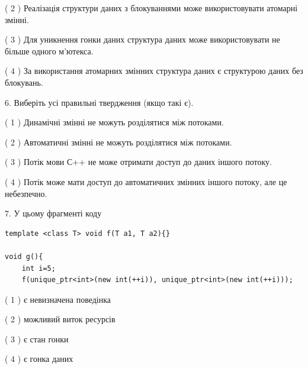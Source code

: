 \documentclass[12pt, ukrainian]{article}
\begin{document}
\begin {large}
{( 2 ) Реалізація структури даних з блокуваннями може використовувати атомарні змінні.%

( 3 ) Для уникнення гонки даних структура даних може використовувати не більше одного м’ютекса.%

( 4 ) За використання атомарних змінних структура даних є структурою даних без блокувань.%
\newpage



\vspace{5mm}
6. Виберіть усі правильні твердження (якщо такі є).\par
\vspace{2mm}

( 1 ) Динамічні змінні не можуть розділятися між потоками.%

( 2 ) Автоматичні змінні не можуть розділятися між потоками.%

( 3 ) Потік мови С++ не може отримати доступ до даних іншого потоку.%

( 4 ) Потік може мати доступ до автоматичних змінних іншого потоку, але це небезпечно.%


\vspace{5mm}
7. У цьому фрагменті коду
\begin{verbatim}
template <class T> void f(T a1, T a2){}

void g(){
    int i=5;
    f(unique_ptr<int>(new int(++i)), unique_ptr<int>(new int(++i)));
\end{verbatim}

( 1 ) є невизначена поведінка%

( 2 ) можливий виток ресурсів%

( 3 ) є стан гонки%

( 4 ) є гонка даних%
}
\end {large}
\end{document}
